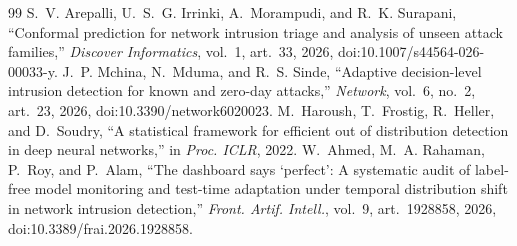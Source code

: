 \documentclass[conference]{IEEEtran}
\begin{document}
\begin{thebibliography}{99}
 S.~V. Arepalli, U.~S.~G. Irrinki, A.~Morampudi, and R.~K. Surapani, ``Conformal prediction for network intrusion triage and analysis of unseen attack families,'' \textit{Discover Informatics}, vol.~1, art.~33, 2026, doi:10.1007/s44564-026-00033-y.
 J.~P. Mchina, N.~Mduma, and R.~S. Sinde, ``Adaptive decision-level intrusion detection for known and zero-day attacks,'' \textit{Network}, vol.~6, no.~2, art.~23, 2026, doi:10.3390/network6020023.
 M.~Haroush, T.~Frostig, R.~Heller, and D.~Soudry, ``A statistical framework for efficient out of distribution detection in deep neural networks,'' in \textit{Proc. ICLR}, 2022.
 W.~Ahmed, M.~A. Rahaman, P.~Roy, and P.~Alam, ``The dashboard says `perfect': A systematic audit of label-free model monitoring and test-time adaptation under temporal distribution shift in network intrusion detection,'' \textit{Front. Artif. Intell.}, vol.~9, art.~1928858, 2026, doi:10.3389/frai.2026.1928858.
\end{thebibliography}
\end{document}
